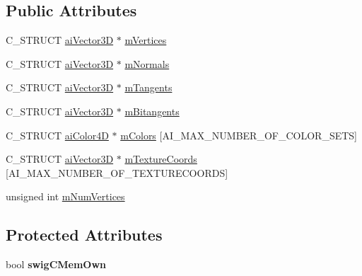 \subsection*{Public Attributes}
\begin{DoxyCompactItemize}
\item 
C\+\_\+\+S\+T\+R\+U\+C\+T \hyperlink{structai_vector3_d}{ai\+Vector3\+D} $\ast$ \hyperlink{structai_anim_mesh_a0ac2dd4c1afd23e6a9293b1d0ded3060}{m\+Vertices}
\item 
C\+\_\+\+S\+T\+R\+U\+C\+T \hyperlink{structai_vector3_d}{ai\+Vector3\+D} $\ast$ \hyperlink{structai_anim_mesh_a64a07a8c5c419b1e006c5302bca4d334}{m\+Normals}
\item 
C\+\_\+\+S\+T\+R\+U\+C\+T \hyperlink{structai_vector3_d}{ai\+Vector3\+D} $\ast$ \hyperlink{structai_anim_mesh_a95dcc49c6d5ecc570ceb54552a0a9625}{m\+Tangents}
\item 
C\+\_\+\+S\+T\+R\+U\+C\+T \hyperlink{structai_vector3_d}{ai\+Vector3\+D} $\ast$ \hyperlink{structai_anim_mesh_a7d60acf4d2b4b59dcc6c88956bfae85f}{m\+Bitangents}
\item 
C\+\_\+\+S\+T\+R\+U\+C\+T \hyperlink{structai_color4_d}{ai\+Color4\+D} $\ast$ \hyperlink{structai_anim_mesh_a4f062d9fac71c6b367fdf0f8638e1ca5}{m\+Colors} \mbox{[}A\+I\+\_\+\+M\+A\+X\+\_\+\+N\+U\+M\+B\+E\+R\+\_\+\+O\+F\+\_\+\+C\+O\+L\+O\+R\+\_\+\+S\+E\+T\+S\mbox{]}
\item 
C\+\_\+\+S\+T\+R\+U\+C\+T \hyperlink{structai_vector3_d}{ai\+Vector3\+D} $\ast$ \hyperlink{structai_anim_mesh_ad24a0451adeb845a53eb2351b9462e0a}{m\+Texture\+Coords} \mbox{[}A\+I\+\_\+\+M\+A\+X\+\_\+\+N\+U\+M\+B\+E\+R\+\_\+\+O\+F\+\_\+\+T\+E\+X\+T\+U\+R\+E\+C\+O\+O\+R\+D\+S\mbox{]}
\item 
unsigned int \hyperlink{structai_anim_mesh_a6bb0d45317a1bbea7f2b7f8191d0c436}{m\+Num\+Vertices}
\end{DoxyCompactItemize}
\subsection*{Protected Attributes}
\begin{DoxyCompactItemize}
\item 
\hypertarget{structai_anim_mesh_a228f3d16f86a1c7d6b849246e471c5a3}{bool {\bfseries swig\+C\+Mem\+Own}}\label{structai_anim_mesh_a228f3d16f86a1c7d6b849246e471c5a3}

\end{DoxyCompactItemize}
